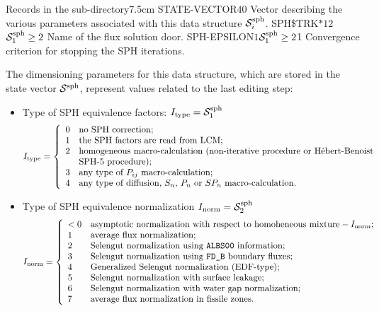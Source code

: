 \begin{DescriptionEnregistrement}{Records in the  sub-directory}{7.5cm}
\IntEnr
  {STATE-VECTOR}{$40$}
  {Vector describing the various parameters associated with this data structure $\mathcal{S}^{\rm sph}_{i}$.}
\OptCharEnr
  {SPH\$TRK}{$*12$}{$\mathcal{S}^{\rm sph}_{1}\ge 2$}
  {Name of the flux solution door.}
\OptRealEnr
  {SPH-EPSILON}{$1$}{$\mathcal{S}^{\rm sph}_{1}\ge 2$}{1}
  {Convergence criterion for stopping the SPH iterations.}
\end{DescriptionEnregistrement}

The dimensioning parameters for this data structure, which are stored in the state vector
$\mathcal{S}^{\rm sph}$, represent values related to the last editing step:

\begin{itemize}

\item Type of SPH equivalence factors: 
      $I_{\rm type}=\mathcal{S}^{\rm sph}_{1}$
\begin{displaymath}
I_{\rm type} = \left\{
\begin{array}{ll}
0 & \textrm{no SPH correction;} \\
1 & \textrm{the SPH factors are read from LCM;} \\
2 & \textrm{homogeneous macro-calculation (non-iterative procedure or H\'ebert-Benoist} \\
   & \textrm{SPH-5 procedure);} \\
3 & \textrm{any type of $P_{ij}$ macro-calculation;} \\
4 & \textrm{any type of diffusion, $S_n$, $P_n$ or $SP_n$ macro-calculation.}
\end{array} \right.
\end{displaymath}
    
\item Type of SPH equivalence normalization $I_{\rm norm}=\mathcal{S}^{\rm sph}_{2}$
\begin{displaymath}
I_{\rm norm} = \left\{
\begin{array}{ll}
<0 & \textrm{asymptotic normalization with respect to homoheneous mixture} -I_{\rm norm}; \\
1 & \textrm{average flux normalization;} \\
2 & \textrm{Selengut normalization using {\tt ALBS00} information;} \\
3 & \textrm{Selengut normalization using {\tt FD\_B} boundary fluxes;} \\
4 & \textrm{Generalized Selengut normalization (EDF-type);} \\
5 & \textrm{Selengut normalization with surface leakage;} \\
6 & \textrm{Selengut normalization with water gap normalization;} \\
7 & \textrm{average flux normalization in fissile zones.}
\end{array} \right.
\end{displaymath}


\end{itemize}
